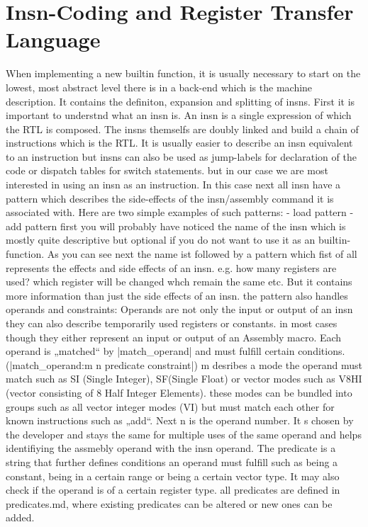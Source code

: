 \chapter{Insn-Coding and Register Transfer Language}
\label{chapter:insn coding}

When implementing a new builtin function, it is usually necessary to start on the lowest, most abstract level there is in a back-end which is the machine description. It contains the definiton, expansion and splitting of insns. First it is important to understnd what an insn is.
An insn is a single expression of which the RTL is composed. The insns themselfs are doubly linked and build a chain of instructions which is the RTL. It is usually easier to describe an insn equivalent to an instruction but insns can also be used as jump-labels for declaration of the code or dispatch tables for switch statements. but in our case we are most interested in using an insn as an instruction. In this case next all insn have a pattern which describes the side-effects of the insn/assembly command it is associated with. Here are two simple examples of such patterns:
- load pattern
- add pattern
first you will probably have noticed the name of the insn which is mostly quite descriptive but optional if you do not want to use it as an builtin-function.
As you can see next the name ist followed by a pattern which fist of all represents the effects and side effects of an insn. e.g. how many registers are used? which register will be changed whch remain the same etc. But it contains more information than just the side effects of an insn. the pattern also handles operands and constraints:
Operands are not only the input or output of an insn they can also describe temporarily used registers or constants. in most cases though they either represent an input or output of an Assembly macro. Each operand is „matched“ by |match_operand| and must fulfill certain conditions.
(|match_operand:m n predicate constraint|)
m desribes a mode the operand must match such as SI (Single Integer), SF(Single Float) or vector modes such as V8HI (vector consisting of 8 Half Integer Elements). these modes can be bundled into groups such as all vector integer modes (VI) but must match each other for known instructions such as „add“.
Next n is the operand number. It s chosen by the developer and stays the same for multiple uses of the same operand and helps identifiying the assmebly operand with the insn operand.
The predicate is a string that further defines conditions an operand must fulfill such as being a constant, being in a certain range or being a certain vector type. It may also check if the operand is of a certain register type. all predicates are defined in predicates.md, where existing predicates can be altered or new ones can be added.
